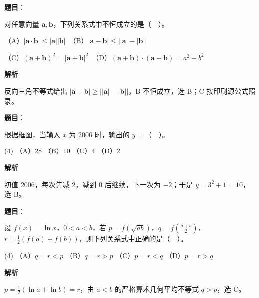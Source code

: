 \begin{answer}

\textbf{题目}：

对任意向量 $\boldsymbol a,\boldsymbol b$，下列关系式中不恒成立的是（　）。

   （A）$|\boldsymbol a\cdot\boldsymbol b|\leq|\boldsymbol a||\boldsymbol b|$　（B）$|\boldsymbol a-\boldsymbol b|\leq\bigl||\boldsymbol a|-|\boldsymbol b|\bigr|$

   （C）$(\boldsymbol a+\boldsymbol b)^2=|\boldsymbol a+\boldsymbol b|^2$　（D）$(\boldsymbol a+\boldsymbol b)\cdot(\boldsymbol a-\boldsymbol b)=a^2-b^2$

\textbf{解析}

反向三角不等式给出 $|\boldsymbol a-\boldsymbol b|\geq\bigl||\boldsymbol a|-|\boldsymbol b|\bigr|$，B 不恒成立，选 B；C 按印刷源公式照录。


\end{answer}
\begin{answer}

\textbf{题目}：

根据框图，当输入 $x$ 为 2006 时，输出的 $y=$（　）。
\nopagebreak[4]
\begin{center}\end{center}
\nopagebreak[4]
\begin{gkopts}(4)
\task （A）28
\task （B）10
\task （C）4
\task （D）2
\end{gkopts}

\textbf{解析}

初值 2006，每次先减 2，减到 0 后继续，下一次为 $-2$；于是 $y=3^2+1=10$，选 B。


\end{answer}
\begin{answer}

\textbf{题目}：

设 $f(x)=\ln x$，$0<a<b$，若 $p=f(\sqrt{ab})$，$q=f(\frac{a+b}{2})$，$r=\frac12(f(a)+f(b))$，则下列关系式中正确的是（　）。

\begin{gkopts}(4)
\task （A）$q=r<p$
\task （B）$q=r>p$
\task （C）$p=r<q$
\task （D）$p=r>q$
\end{gkopts}

\textbf{解析}

$p=\frac12(\ln a+\ln b)=r$，由 $a<b$ 的严格算术几何平均不等式 $q>p$，选 C。


\end{answer}
